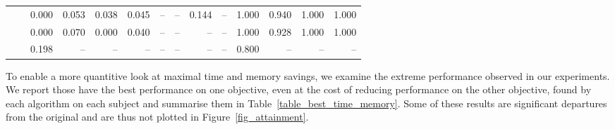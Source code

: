\begin{table*}[htb]
{\begin{tabular}{|l|l|r|r|r|r|r|r|r|r|r|r|r|r|}
\multirow{2}{*}{\dr{}}              & \sn{}        & 0.000                     & 0.053                     & 0.038                     & 0.045                    & --                        & --                        & 0.144                     & --                       & 1.000                     & 0.940                     & 1.000                     & 1.000                    \\
                                   & \sr{}        & 0.000                     & 0.070                     & 0.000                     & 0.040                    & --                        & --                        & --                        & --                       & 1.000                     & 0.928                     & 1.000                     & 1.000                    \\ \hline
\multicolumn{1}{|c|}{\sn{}}         & \sr{}        & 0.198                     & --                        & --                        & --                       & --                        & --                        & --                        & --                       & 0.800                     & --                        & --                        & --                       \\ \hline
\end{tabular}
}
\end{table*}

To enable a more quantitive look at maximal time and memory savings, we
examine the extreme performance observed in our experiments. We report
those have the best performance on
one objective, even at the cost of reducing performance on the other
objective, found by each
algorithm on each subject and summarise them in Table~\ref{table_best_time_memory}.
Some of these results are significant
departures from the original and are thus not plotted in Figure~\ref{fig_attainment}. 

